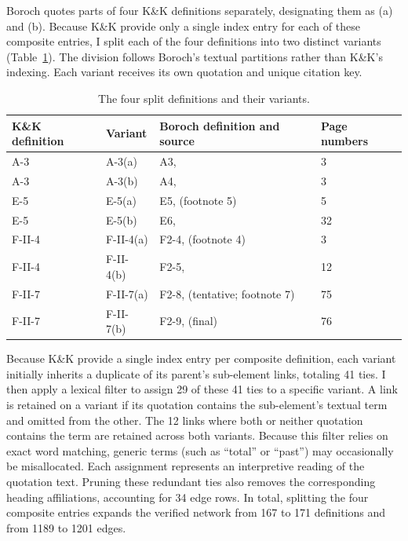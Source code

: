 \documentclass[11pt]{article}
\begin{document}
Boroch quotes parts of four K\&K definitions separately, designating them as (a) and (b). Because K\&K provide only a single index entry for each of these composite entries, I split each of the four definitions into two distinct variants (Table~\ref{tab:splits}). The division follows Boroch's textual partitions rather than K\&K's indexing. Each variant receives its own quotation and unique citation key.

\begin{table}[t]
\centering
\caption{The four split definitions and their variants.}
\label{tab:splits}
\begin{tabular}{llll}
\toprule
K\&K definition & Variant & Boroch definition and source & Page numbers \\
\midrule
A-3 & A-3(a) & A3, \citealt{dixon1928} & 3 \\
A-3 & A-3(b) & A4, \citealt{dixon1928} & 3 \\
E-5 & E-5(a) & E5, \citealt{linton1945a} (footnote 5) & 5 \\
E-5 & E-5(b) & E6, \citealt{linton1945a} & 32 \\
F-II-4 & F-II-4(a) & F2-4, \citealt{blumenthal1937} (footnote 4) & 3 \\
F-II-4 & F-II-4(b) & F2-5, \citealt{blumenthal1937} & 12 \\
F-II-7 & F-II-7(a) & F2-8, \citealt{feibleman1946} (tentative; footnote 7) & 75 \\
F-II-7 & F-II-7(b) & F2-9, \citealt{feibleman1946} (final) & 76 \\
\bottomrule
\end{tabular}
\end{table}

Because K\&K provide a single index entry per composite definition, each variant initially inherits a duplicate of its parent's sub-element links, totaling 41 ties. I then apply a lexical filter to assign 29 of these 41 ties to a specific variant. A link is retained on a variant if its quotation contains the sub-element's textual term and omitted from the other. The 12 links where both or neither quotation contains the term are retained across both variants. Because this filter relies on exact word matching, generic terms (such as ``total'' or ``past'') may occasionally be misallocated. Each assignment represents an interpretive reading of the quotation text. Pruning these redundant ties also removes the corresponding heading affiliations, accounting for 34 edge rows. In total, splitting the four composite entries expands the verified network from 167 to 171 definitions and from 1189 to 1201 edges.
\end{document}
